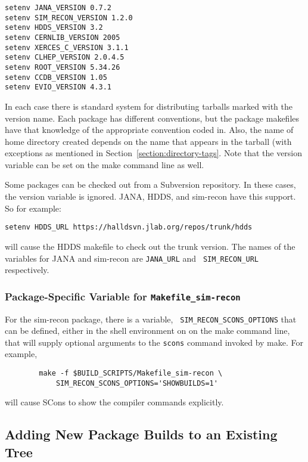 \documentclass[12pt]{article}
\begin{document}
\begin{verbatim}
setenv JANA_VERSION 0.7.2
setenv SIM_RECON_VERSION 1.2.0
setenv HDDS_VERSION 3.2
setenv CERNLIB_VERSION 2005
setenv XERCES_C_VERSION 3.1.1
setenv CLHEP_VERSION 2.0.4.5
setenv ROOT_VERSION 5.34.26
setenv CCDB_VERSION 1.05
setenv EVIO_VERSION 4.3.1
\end{verbatim}

In each case there is standard system for distributing tarballs marked
with the version name. Each package has different conventions, but the
package makefiles have that knowledge of the appropriate convention
coded in. Also, the name of home directory created depends on the name
that appears in the tarball (with exceptions as mentioned in
Section~\ref{section:directory-tags}. Note that the version variable
can be set on the make command line as well.

Some packages can be checked out from a Subversion repository. In
these cases, the version variable is ignored. JANA, HDDS, and
sim-recon have this support. So for example:

\begin{verbatim}
setenv HDDS_URL https://halldsvn.jlab.org/repos/trunk/hdds
\end{verbatim}

will cause the HDDS makefile to check out the trunk version. The names
of the variables for JANA and sim-recon are {\tt JANA\_URL} and {\tt
  SIM\_RECON\_URL} respectively.

\subsubsection{Package-Specific Variable for {\tt Makefile\_sim-recon}}

For the sim-recon package, there is a variable, {\tt
  SIM\_RECON\_SCONS\_OPTIONS} that can be defined, either in the shell
environment on on the make command line, that will supply optional
arguments to the {\tt scons} command invoked by make. For example,
\begin{verbatim}
        make -f $BUILD_SCRIPTS/Makefile_sim-recon \
            SIM_RECON_SCONS_OPTIONS='SHOWBUILDS=1'
\end{verbatim}
will cause SCons to show the compiler commands explicitly.

\subsection{Adding New Package Builds to an Existing Tree}\label{section:adding-packages}
\end{document}
